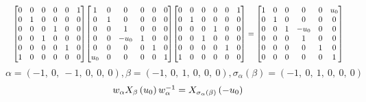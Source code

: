\documentclass[11pt]{article}
\theoremstyle{definition}
\begin{document}
\[
\scaletoalign{\textwidth}{{\left[\begin{matrix}0 & 0 & 0 & 0 & 0 & 1\\0 & 1 & 0 & 0 & 0 & 0\\0 & 0 & 0 & 1 & 0 & 0\\0 & 0 & 1 & 0 & 0 & 0\\0 & 0 & 0 & 0 & 1 & 0\\1 & 0 & 0 & 0 & 0 & 0\end{matrix}\right]} {\left[\begin{matrix}1 & 0 & 0 & 0 & 0 & 0\\0 & 1 & 0 & 0 & 0 & 0\\0 & 0 & 1 & 0 & 0 & 0\\0 & 0 & - u_{0} & 1 & 0 & 0\\0 & 0 & 0 & 0 & 1 & 0\\u_{0} & 0 & 0 & 0 & 0 & 1\end{matrix}\right]} {\left[\begin{matrix}0 & 0 & 0 & 0 & 0 & 1\\0 & 1 & 0 & 0 & 0 & 0\\0 & 0 & 0 & 1 & 0 & 0\\0 & 0 & 1 & 0 & 0 & 0\\0 & 0 & 0 & 0 & 1 & 0\\1 & 0 & 0 & 0 & 0 & 0\end{matrix}\right]} = {\left[\begin{matrix}1 & 0 & 0 & 0 & 0 & u_{0}\\0 & 1 & 0 & 0 & 0 & 0\\0 & 0 & 1 & - u_{0} & 0 & 0\\0 & 0 & 0 & 1 & 0 & 0\\0 & 0 & 0 & 0 & 1 & 0\\0 & 0 & 0 & 0 & 0 & 1\end{matrix}\right]}}
\]
\[
\alpha = \left( -1, \  0, \  -1, \  0, \  0, \  0\right), \beta = \left( -1, \  0, \  1, \  0, \  0, \  0\right), \sigma_{\alpha}(\beta) = \left( -1, \  0, \  1, \  0, \  0, \  0\right)
\]
\[
\scaletoalign{\textwidth}{w_{\alpha} X_{\beta}\left(u_{0}\right) w_{\alpha}^{-1} = X_{\sigma_{\alpha}\left(\beta\right)}\left(- u_{0}\right)}
\]
\end{document}

